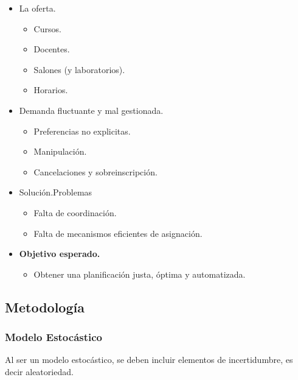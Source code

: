 \documentclass{article}
\begin{document}
\begin{itemize}
  \item La oferta.
        \begin{itemize}
          \item Cursos.
          \item Docentes.
          \item Salones (y laboratorios).
          \item Horarios.
        \end{itemize}
  \item Demanda fluctuante y mal gestionada.
        \begin{itemize}
          \item Preferencias no explicitas.
          \item Manipulación.
          \item Cancelaciones y sobreinscripción.
        \end{itemize}
  \item Solución.Problemas
        \begin{itemize}
          \item Falta de coordinación.
          \item Falta de mecanismos eficientes de asignación.
        \end{itemize}
  \item \textbf{Objetivo esperado.}
        \begin{itemize}
          \item Obtener una planificación justa, óptima y automatizada.
        \end{itemize}
\end{itemize}

\subsection{Metodología}

\subsubsection{Modelo Estocástico}

Al ser un modelo estocástico, se deben incluir elementos de incertidumbre, es decir aleatoriedad.


\end{document}
